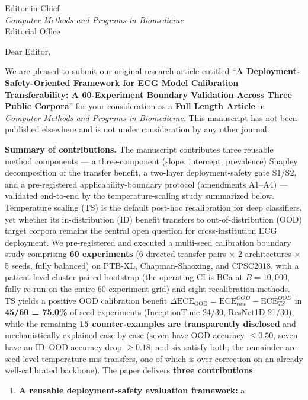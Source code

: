 \documentclass[11pt,letterpaper]{letter}
\begin{document}
\begin{letter}{Editor-in-Chief\\
\emph{Computer Methods and Programs in Biomedicine}\\
Editorial Office}

\opening{Dear Editor,}

We are pleased to submit our original research article entitled
``\textbf{A Deployment-Safety-Oriented Framework for ECG Model
Calibration Transferability: A 60-Experiment Boundary Validation
Across Three Public Corpora}'' for your
consideration as a \textbf{Full Length Article} in
\emph{Computer Methods and Programs in Biomedicine}. This manuscript has not
been published elsewhere and is not under consideration by any other
journal.

\bigskip

\textbf{Summary of contributions.}
The manuscript contributes three reusable method components --- a
three-component (slope, intercept, prevalence) Shapley decomposition
of the transfer benefit, a two-layer deployment-safety gate S1/S2,
and a pre-registered applicability-boundary protocol (amendments
A1--A4) --- validated end-to-end by the temperature-scaling study
summarized below.
Temperature scaling (TS) is the default post-hoc recalibration for deep
classifiers, yet whether its in-distribution (ID) benefit transfers to
out-of-distribution (OOD) target corpora remains the central open
question for cross-institution ECG deployment. We pre-registered and
executed a multi-seed calibration boundary study comprising
\textbf{60 experiments} (6 directed transfer pairs $\times$ 2
architectures $\times$ 5 seeds, fully balanced) on PTB-XL,
Chapman-Shaoxing, and CPSC2018, with a patient-level cluster paired
bootstrap (the operating CI is BCa at $B=10{,}000$, fully re-run on the
entire 60-experiment grid) and eight recalibration methods. TS yields a
positive OOD calibration benefit
$\Delta\text{ECE}_{\text{OOD}}=\text{ECE}_{raw}^{OOD}
-\text{ECE}_{TS}^{OOD}$ in \textbf{45/60 = 75.0\%} of seed experiments
(InceptionTime 24/30, ResNet1D 21/30), while the remaining
\textbf{15 counter-examples are transparently disclosed} and
mechanistically explained case by case (seven have OOD accuracy
$\leq 0.50$, seven have an ID--OOD accuracy drop $\geq 0.18$, and six
satisfy both; the remainder are
seed-level temperature mis-transfers, one of which is
over-correction on an already well-calibrated backbone). The
paper delivers \textbf{three contributions}:
\begin{enumerate}
\item \textbf{A reusable deployment-safety evaluation framework:} a

\end{enumerate}
\end{letter}
\end{document}

